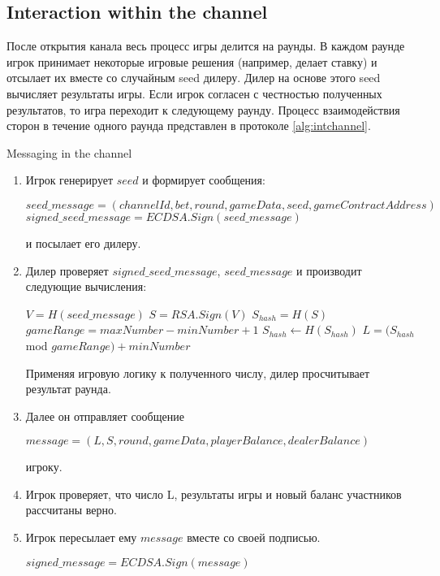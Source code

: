 		\subsection {Interaction within the channel}
После открытия канала весь процесс игры делится на раунды. В каждом раунде игрок принимает некоторые игровые решения (например, делает ставку) и отсылает их вместе со случайным seed дилеру. Дилер на основе этого seed вычисляет результаты игры. Если игрок согласен с честностью полученных результатов, то игра переходит к следующему раунду. Процесс взаимодействия сторон в течение одного раунда представлен в протоколе \autoref{alg:intchannel}. \\
\begin{algorithm}
\caption{Messaging in the channel} \label{alg:intchannel}
\begin{enumerate}
	\item Игрок генерирует $seed$  и  формирует сообщения:
\begin{center}
$ seed\_message = (channelId, bet, round, gameData, seed, gameContractAddress)$
$signed\_seed\_message = ECDSA.Sign(seed\_message)$ 
\end{center}
 и посылает его дилеру. 
	\item Дилер проверяет $signed\_seed\_message$, $seed\_message$ и производит следующие вычисления:
 \begin{algorithmic}
\State $V = H(seed\_message)$
\State $S = RSA.Sign(V)$
\State $S_{hash} = H(S)$
\State $gameRange = maxNumber -  minNumber + 1$
\State$ S_{hash}\gets H(S_{hash})$
\EndWhile
\State $L = (S_{hash}$ mod $gameRange) + minNumber$
 \end{algorithmic}
 Применяя игровую логику к полученного числу, дилер просчитывает результат раунда.
\item Далее он отправляет сообщение
\begin{center}
 $message = (L,S, round, gameData, playerBalance, dealerBalance)$
\end{center}
 игроку.
	\item Игрок проверяет, что число L, результаты игры и новый баланс участников рассчитаны верно.
	\item Игрок пересылает ему $message$ вместе со своей подписью. 
\begin{center}
 $signed\_message = ECDSA.Sign(message)$
\end{center}
\end{enumerate}
\end{algorithm}


